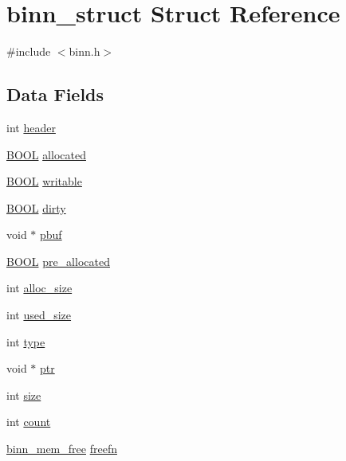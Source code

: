 \hypertarget{structbinn__struct}{}\section{binn\+\_\+struct Struct Reference}
\label{structbinn__struct}


{\ttfamily \#include $<$binn.\+h$>$}

\subsection*{Data Fields}
\begin{DoxyCompactItemize}
\item 
int \hyperlink{structbinn__struct_adc7ed4d9991bc47d473e178bd4fe9a49}{header}
\item 
\hyperlink{binn_8h_a050c65e107f0c828f856a231f4b4e788}{B\+O\+OL} \hyperlink{structbinn__struct_aff03b6df54fff7135a4185aa7065cb7d}{allocated}
\item 
\hyperlink{binn_8h_a050c65e107f0c828f856a231f4b4e788}{B\+O\+OL} \hyperlink{structbinn__struct_a73ec689e25e4a578a01fbb1dbcff0495}{writable}
\item 
\hyperlink{binn_8h_a050c65e107f0c828f856a231f4b4e788}{B\+O\+OL} \hyperlink{structbinn__struct_a0d524507b6027bd4e728e12f446be5c9}{dirty}
\item 
void $\ast$ \hyperlink{structbinn__struct_abdefcde8a25619fc71ee548d5241cde0}{pbuf}
\item 
\hyperlink{binn_8h_a050c65e107f0c828f856a231f4b4e788}{B\+O\+OL} \hyperlink{structbinn__struct_ab479c42c8c6ffbcbd68ee197c31332f6}{pre\+\_\+allocated}
\item 
int \hyperlink{structbinn__struct_a43ab546b0fdc85de9d25d62dc4564e62}{alloc\+\_\+size}
\item 
int \hyperlink{structbinn__struct_a9bc460fe61e5ac07e6c1534c7f6e0d6b}{used\+\_\+size}
\item 
int \hyperlink{structbinn__struct_ac765329451135abec74c45e1897abf26}{type}
\item 
void $\ast$ \hyperlink{structbinn__struct_add9af9569af79ec26dd741fb226b38ba}{ptr}
\item 
int \hyperlink{structbinn__struct_a439227feff9d7f55384e8780cfc2eb82}{size}
\item 
int \hyperlink{structbinn__struct_ad43c3812e6d13e0518d9f8b8f463ffcf}{count}
\item 
\hyperlink{binn_8h_a0a1a8d8952b9cff264203eec80e1db2b}{binn\+\_\+mem\+\_\+free} \hyperlink{structbinn__struct_acf1b3cb2ec3d95daf5bf617b2e8516e6}{freefn}

\end{DoxyCompactItemize}
